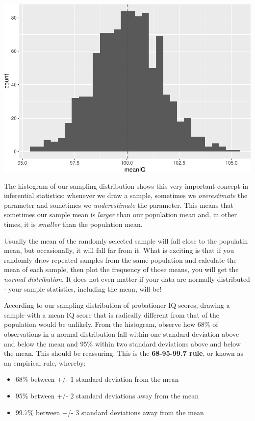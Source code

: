 \documentclass[
]{book}
\providecommand{\tightlist}{%
  \setlength{\itemsep}{0pt}\setlength{\parskip}{0pt}}
\begin{document}
\includegraphics{05-inferential-statistics_files/figure-latex/unnamed-chunk-19-1.pdf}

The histogram of our sampling distribution shows this very important concept in inferential statistics: whenever we draw a sample, sometimes we \emph{overestimate} the parameter and sometimes we \emph{underestimate} the parameter. This means that sometimes our sample mean is \emph{larger} than our population mean and, in other times, it is \emph{smaller} than the population mean.

Usually the mean of the randomly selected sample will fall close to the populatin mean, but occasionally, it will fall far from it. What is exciting is that if you randomly draw repeated samples from the same population and calculate the mean of each sample, then plot the frequency of those means, you will get the \emph{normal distribution}. It does not even matter if your data are normally distributed - your sample statistics, including the mean, will be!

According to our sampling distribution of probationer IQ scores, drawing a sample with a mean IQ score that is radically different from that of the population would be unlikely. From the histogram, observe how 68\% of observations in a normal distribution fall within one standard deviation above and below the mean and 95\% within two standard deviations above and below the mean. This should be reassuring. This is the \textbf{68-95-99.7 rule}, or known as an empirical rule, whereby:

\begin{itemize}
\tightlist
\item
  68\% between +/- 1 standard deviation from the mean
\item
  95\% between +/- 2 standard deviations away from the mean
\item
  99.7\% between +/- 3 standard deviations away from the mean
\end{itemize}
\end{document}
